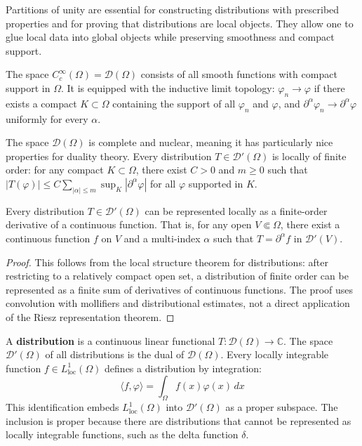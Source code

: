 Partitions of unity are essential for constructing distributions with prescribed properties and for proving that distributions are local objects. They allow one to glue local data into global objects while preserving smoothness and compact support.

\begin{definition}
The space $C_c^\infty(\Omega) = \mathcal{D}(\Omega)$ consists of all smooth functions with compact support in $\Omega$. It is equipped with the inductive limit topology: $\varphi_n \to \varphi$ if there exists a compact $K \subset \Omega$ containing the support of all $\varphi_n$ and $\varphi$, and $\partial^\alpha \varphi_n \to \partial^\alpha \varphi$ uniformly for every $\alpha$.
\end{definition}

The space $\mathcal{D}(\Omega)$ is complete and nuclear, meaning it has particularly nice properties for duality theory. Every distribution $T \in \mathcal{D}'(\Omega)$ is locally of finite order: for any compact $K \subset \Omega$, there exist $C > 0$ and $m \geq 0$ such that $|T(\varphi)| \leq C \sum_{|\alpha| \leq m} \sup_K |\partial^\alpha \varphi|$ for all $\varphi$ supported in $K$.

\begin{theorem}
Every distribution $T \in \mathcal{D}'(\Omega)$ can be represented locally as a finite-order derivative of a continuous function. That is, for any open $V \Subset \Omega$, there exist a continuous function $f$ on $V$ and a multi-index $\alpha$ such that $T = \partial^\alpha f$ in $\mathcal{D}'(V)$.
\end{theorem}

\begin{proof}
This follows from the local structure theorem for distributions: after
restricting to a relatively compact open set, a distribution of finite order
can be represented as a finite sum of derivatives of continuous functions.
The proof uses convolution with mollifiers and distributional estimates, not a
direct application of the Riesz representation theorem.
\end{proof}

A \textbf{distribution} is a continuous linear functional $T: \mathcal{D}(\Omega) \to \mathbb{C}$. The space $\mathcal{D}'(\Omega)$ of all distributions is the dual of $\mathcal{D}(\Omega)$. Every locally integrable function $f \in L^1_{\text{loc}}(\Omega)$ defines a distribution by integration:
\[\langle f, \varphi \rangle = \int_\Omega f(x) \varphi(x) \, dx\]
This identification embeds $L^1_{\text{loc}}(\Omega)$ into $\mathcal{D}'(\Omega)$ as a proper subspace. The inclusion is proper because there are distributions that cannot be represented as locally integrable functions, such as the delta function $\delta$.

